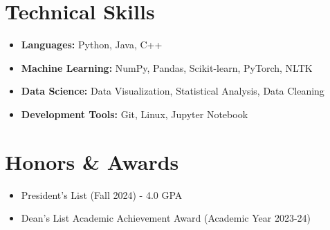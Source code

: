 \documentclass[letterpaper,11pt]{article}
\begin{document}
\section{Technical Skills}
\begin{itemize}
    \item \textbf{Languages:} Python, Java, C++
    \item \textbf{Machine Learning:} NumPy, Pandas, Scikit-learn, PyTorch, NLTK
    \item \textbf{Data Science:} Data Visualization, Statistical Analysis, Data Cleaning
    \item \textbf{Development Tools:} Git, Linux, Jupyter Notebook
\end{itemize}

\section{Honors \& Awards}
\begin{itemize}
    \item President's List (Fall 2024) - 4.0 GPA
    \item Dean’s List Academic Achievement Award (Academic Year 2023-24)
\end{itemize}
\end{document}
